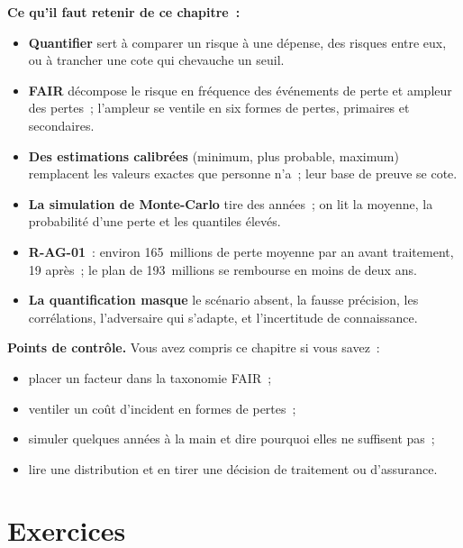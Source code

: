 \separateur

\begin{boxresume}
\textbf{Ce qu'il faut retenir de ce chapitre~:}
\begin{itemize}
    \item \textbf{Quantifier} sert à comparer un risque à une dépense, des
          risques entre eux, ou à trancher une cote qui chevauche un seuil.
    \item \textbf{FAIR} décompose le risque en fréquence des événements de
          perte et ampleur des pertes~; l'ampleur se ventile en six formes
          de pertes, primaires et secondaires.
    \item \textbf{Des estimations calibrées} (minimum, plus probable,
          maximum) remplacent les valeurs exactes que personne n'a~; leur
          base de preuve se cote.
    \item \textbf{La simulation de Monte-Carlo} tire des années~; on lit la
          moyenne, la probabilité d'une perte et les quantiles élevés.
    \item \textbf{R-AG-01}~: environ 165~millions de perte moyenne par an
          avant traitement, 19 après~; le plan de 193~millions se rembourse
          en moins de deux ans.
    \item \textbf{La quantification masque} le scénario absent, la fausse
          précision, les corrélations, l'adversaire qui s'adapte, et
          l'incertitude de connaissance.
\end{itemize}
\end{boxresume}

\begin{boxinfo}
\textbf{Points de contrôle.} Vous avez compris ce chapitre si vous savez~:
\begin{itemize}
    \item placer un facteur dans la taxonomie FAIR~;
    \item ventiler un coût d'incident en formes de pertes~;
    \item simuler quelques années à la main et dire pourquoi elles ne
          suffisent pas~;
    \item lire une distribution et en tirer une décision de traitement ou
          d'assurance.
\end{itemize}
\end{boxinfo}

\section*{Exercices}

